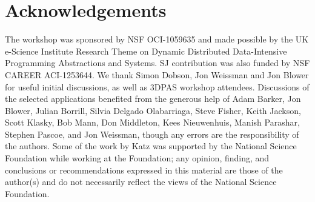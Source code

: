 






\section*{Acknowledgements}
The workshop was sponsored by NSF OCI-1059635 and made possible by the UK
e-Science Institute Research Theme on Dynamic Distributed Data-Intensive
Programming Abstractions and Systems.  SJ contribution was also funded by NSF
CAREER ACI-1253644.  We thank Simon Dobson, Jon Weissman and Jon Blower for
useful initial discussions, as well as 3DPAS workshop attendees. Discussions of
the selected applications benefited from the generous help of Adam Barker, Jon
Blower, Julian Borrill, Silvia Delgado Olabarriaga, Steve Fisher, Keith Jackson,
Scott Klasky, Bob Mann, Don Middleton, Kees Nieuwenhuis, Manish Parashar,
Stephen Pascoe, and Jon Weissman, though any errors are the responsibility of
the authors.  Some of the work by Katz was supported by the National Science
Foundation while working at the Foundation; any opinion, finding, and
conclusions or recommendations expressed in this material are those of the
author(s) and do not necessarily reflect the views of the National Science
Foundation.

